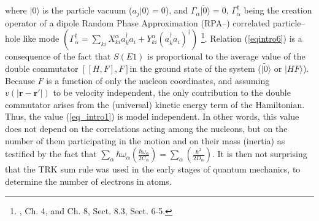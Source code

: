 where $|0\rangle$ is the particle vacuum ($a_j|0\rangle=0$), and $\Gamma_\alpha|\tilde 0\rangle=0$, $\Gamma^\dagger_\alpha$ being the creation operator of a dipole Random Phase Approximation (RPA--) correlated particle--hole like mode $(\Gamma_\alpha^\dagger=\sum_{ki}X_{ki}^\alpha a_k^\dagger a_i+Y^\alpha_{ki}(a_k^\dagger a_i)^\dagger)$ \footnote{\cite{Bertsch:05}, Ch. 4, and \cite{Brink:05} Ch. 8, Sect. 8.3, \cite{Bohr:75} Sect. 6-5.}. Relation (\ref{eqintro6}) is a consequence of the fact that $S(E1)$ is proportional to the average value of the double  commutator $[[H,F],F]$in the ground state of the system ($|\tilde 0\rangle$ or $|HF\rangle$). Because $F$ is a function of only the nucleon coordinates, and assuming $v(|\mathbf{r}-\mathbf{r}'|)$ to be velocity independent, the only contribution to the double commutator arises from the (universal) kinetic energy term of the Hamiltonian. Thus, the value (\ref{eq_intro1}) is model independent. In other words, this value does not depend on the correlations acting among the nucleons, but on the number of them participating in the motion and on their mass (inertia) as testified by the fact that $\sum_{\alpha}\hbar \omega_\alpha\left(\frac{\hbar\omega_\alpha}{2C_\alpha}\right)=\sum_{\alpha}\left(\frac{\hbar^2}{2D_\alpha}\right)$. It is then not surprising that the TRK sum rule was used in the early stages of quantum mechanics, to determine the number of electrons in atoms.


